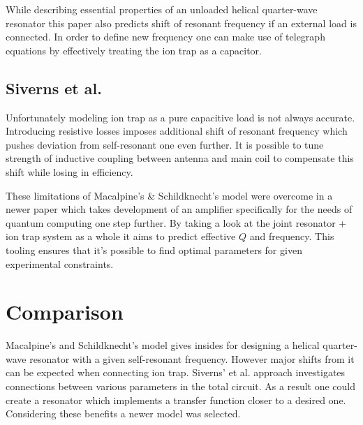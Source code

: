 While describing essential properties of an unloaded helical quarter-wave resonator this paper \cite{Macalpine2000} also predicts shift of resonant frequency if an external load is connected. In order to define new frequency one can make use of telegraph equations \cite{Rohde2009} by effectively treating the ion trap as a capacitor.

\subsection{Siverns et al.}
Unfortunately modeling ion trap as a pure capacitive load is not always accurate. Introducing resistive losses imposes additional shift of resonant frequency which pushes deviation from self-resonant one even further. It is possible to tune strength of inductive coupling between antenna and main coil to compensate this shift while losing in efficiency.

These limitations of Macalpine's \& Schildknecht's \cite{Macalpine2000} model were overcome in a newer paper \cite{Siverns2012} which takes development of an amplifier specifically for the needs of quantum computing one step further. By taking a look at the joint resonator + ion trap system as a whole it aims to predict effective $Q$ and frequency. This tooling ensures that it's possible to find optimal parameters for given experimental constraints.

\section{Comparison}
Macalpine's and Schildknecht's \cite{Macalpine2000} model gives insides for designing a helical quarter-wave resonator with a given self-resonant frequency. However major shifts from it can be expected when connecting ion trap. Siverns' et al. approach \cite{Siverns2012} investigates connections between various parameters in the total circuit. As a result one could create a resonator which implements a transfer function closer to a desired one. Considering these benefits a newer model \cite{Siverns2012} was selected.